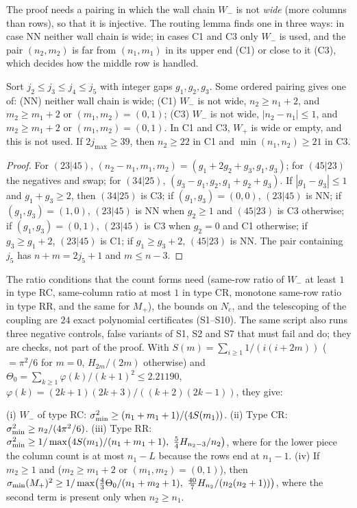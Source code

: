 The proof needs a pairing in which the wall chain $W_-$ is not \emph{wide} (more columns
than rows), so that it is injective. The routing lemma finds one in three ways: in
case NN neither wall chain is wide; in cases C1 and C3 only $W_-$ is used, and the
pair $(n_2,m_2)$ is far from $(n_1,m_1)$ in its upper end (C1) or close to it (C3),
which decides how the middle row is handled.

\begin{lemma}[Routing]\label{lem:routing}
Sort $j_2\le j_3\le j_4\le j_5$ with integer gaps $g_1,g_2,g_3$. Some ordered pairing gives
one of: (NN) neither wall chain is wide; (C1) $W_-$ is not wide, $n_2\ge n_1+2$, and
$m_2\ge m_1+2$ or $(m_1,m_2)=(0,1)$; (C3) $W_-$ is not wide, $|n_2-n_1|\le1$, and
$m_2\ge m_1+2$ or $(m_1,m_2)=(0,1)$. In C1 and C3, $W_+$ is wide or empty, and this is
not used. If $2j_{\max}\ge39$, then $n_2\ge22$ in C1 and $\min(n_1,n_2)\ge21$ in C3.
\end{lemma}

\begin{proof}
For $(23|45)$, $(n_2-n_1,m_1,m_2)=(g_1+2g_2+g_3,g_1,g_3)$; for $(45|23)$ the negatives and
swap; for $(34|25)$, $(g_3-g_1,g_2,g_1+g_2+g_3)$. If $|g_1-g_3|\le1$ and $g_1+g_3\ge2$, then
$(34|25)$ is C3; if $(g_1,g_3)=(0,0)$, $(23|45)$ is NN; if $(g_1,g_3)=(1,0)$, $(23|45)$ is NN
when $g_2\ge1$ and $(45|23)$ is C3 otherwise; if $(g_1,g_3)=(0,1)$, $(23|45)$ is C3 when
$g_2=0$ and C1 otherwise; if $g_3\ge g_1+2$, $(23|45)$ is C1; if $g_1\ge g_3+2$, $(45|23)$ is
NN. The pair containing $j_5$ has $n+m=2j_5+1$ and $m\le n-3$.
\end{proof}

The ratio conditions that the count forms need (same-row ratio of $W_-$ at least $1$ in type RC,
same-column ratio at most $1$ in type CR, monotone same-row ratio in type RR, and the same for
$M_+$), the bounds on $N_c$, and the telescoping of the coupling are $24$ exact polynomial
certificates (S1--S10). The same script also runs three negative controls, false variants
of S1, S2 and S7 that must fail and do; they are checks, not part of the proof. With
$S(m)=\sum_{i\ge1}1/(i(i+2m))$ ($=\pi^2/6$ for $m=0$, $H_{2m}/(2m)$ otherwise) and
$\Theta_0=\sum_{k\ge1}\varphi(k)/(k+1)^2\le2.21190$, $\varphi(k)=(2k+1)(2k+3)/((k+2)(2k-1))$, they
give:

\begin{lemma}\label{lem:j2bounds}
(i) $W_-$ of type RC: $\sigma_{\min}^2\ge(n_1+m_1+1)/(4S(m_1))$. (ii) Type CR: $\sigma_{\min}^2\ge n_2/(4\pi^2/6)$.
(iii) Type RR: $\smin^2\ge1/\max\bigl(4S(m_1)/(n_1+m_1+1),\ \frac54H_{n_2-3}/n_2\bigr)$, where for the
lower piece the column count is at most $n_1-L$ because the rows end at $n_1-1$.
(iv) If $m_2\ge1$ and ($m_2\ge m_1+2$ or $(m_1,m_2)=(0,1)$), then
$\smin(M_+)^2\ge1/\max\bigl(\frac43\Theta_0/(n_1+m_2+1),\ \frac{40}7H_{n_2}/(n_2(n_2+1))\bigr)$, where the
second term is present only when $n_2\ge n_1$.
\end{lemma}

